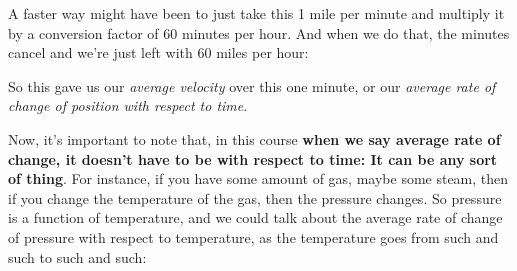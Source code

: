 \documentclass[pdftex, brazil, 12pt, twoside]{article}
\begin{document}
\begin{figure}[H]
  \begin{center}
  \end{center}
\end{figure}

A faster way might have been to just take
this 1 mile per minute and multiply it by a conversion
factor of 60 minutes per hour.
And when we do that, the minutes cancel
and we're just left with 60 miles per hour:

\begin{figure}[H]
  \begin{center}
  \end{center}
\end{figure}

So this gave us our \emph{average velocity} over this one minute,
or our \emph{average rate of change of position with respect to time}.

Now, it's important to note that, in this course \textbf{when
we say average rate of change, it doesn't have to be with respect to time:
It can be any sort of thing}.
For instance, if you have some amount of gas, maybe
some steam, then if you change the temperature of the gas,
then the pressure changes.
So pressure is a function of temperature,
and we could talk about the average rate of change
of pressure with respect to temperature,
as the temperature goes from such and such to such and such:

\begin{figure}[H]
  \begin{center}
  \end{center}
\end{figure}
\end{document}
